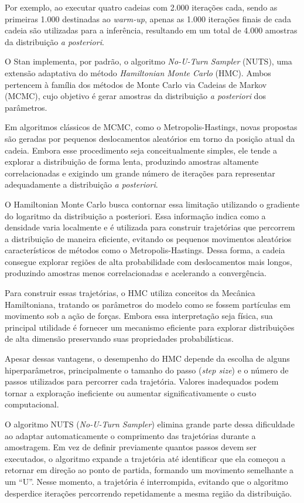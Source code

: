 \documentclass[
  brazilian,
  12pt,
  letterpaper,
  DIV=11,
  numbers=noendperiod]{scrartcl}
\begin{document}
Por exemplo, ao executar quatro cadeias com 2.000 iterações cada, sendo
as primeiras 1.000 destinadas ao \emph{warm-up}, apenas as 1.000
iterações finais de cada cadeia são utilizadas para a inferência,
resultando em um total de 4.000 amostras da distribuição \emph{a
posteriori}.

O Stan implementa, por padrão, o algoritmo \emph{No-U-Turn Sampler}
(NUTS), uma extensão adaptativa do método \emph{Hamiltonian Monte Carlo}
(HMC). Ambos pertencem à família dos métodos de Monte Carlo via Cadeias
de Markov (MCMC), cujo objetivo é gerar amostras da distribuição \emph{a
posteriori} dos parâmetros.

Em algoritmos clássicos de MCMC, como o Metropolis-Hastings, novas
propostas são geradas por pequenos deslocamentos aleatórios em torno da
posição atual da cadeia. Embora esse procedimento seja conceitualmente
simples, ele tende a explorar a distribuição de forma lenta, produzindo
amostras altamente correlacionadas e exigindo um grande número de
iterações para representar adequadamente a distribuição \emph{a
posteriori}.

O Hamiltonian Monte Carlo busca contornar essa limitação utilizando o
gradiente do logaritmo da distribuição a posteriori. Essa informação
indica como a densidade varia localmente e é utilizada para construir
trajetórias que percorrem a distribuição de maneira eficiente, evitando
os pequenos movimentos aleatórios característicos de métodos como o
Metropolis-Hastings. Dessa forma, a cadeia consegue explorar regiões de
alta probabilidade com deslocamentos mais longos, produzindo amostras
menos correlacionadas e acelerando a convergência.

Para construir essas trajetórias, o HMC utiliza conceitos da Mecânica
Hamiltoniana, tratando os parâmetros do modelo como se fossem partículas
em movimento sob a ação de forças. Embora essa interpretação seja
física, sua principal utilidade é fornecer um mecanismo eficiente para
explorar distribuições de alta dimensão preservando suas propriedades
probabilísticas.

Apesar dessas vantagens, o desempenho do HMC depende da escolha de
alguns hiperparâmetros, principalmente o tamanho do passo (\emph{step
size}) e o número de passos utilizados para percorrer cada trajetória.
Valores inadequados podem tornar a exploração ineficiente ou aumentar
significativamente o custo computacional.

O algoritmo NUTS (\emph{No-U-Turn Sampler}) elimina grande parte dessa
dificuldade ao adaptar automaticamente o comprimento das trajetórias
durante a amostragem. Em vez de definir previamente quantos passos devem
ser executados, o algoritmo expande a trajetória até identificar que ela
começou a retornar em direção ao ponto de partida, formando um movimento
semelhante a um ``U''. Nesse momento, a trajetória é interrompida,
evitando que o algoritmo desperdice iterações percorrendo repetidamente
a mesma região da distribuição.
\end{document}
